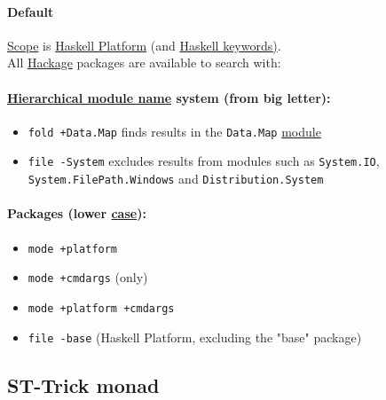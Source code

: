 \documentclass[11pt]{article}
\begin{document}
\paragraph{Default}
\label{sec:orga4efe3e}

\hyperref[orga4eed83]{Scope} is \href{http://hackage.haskell.org/platform}{Haskell Platform} (and \href{http://haskell.org/haskellwiki/Keywords}{Haskell keywords)}.\\

All \href{http://hackage.haskell.org/}{Hackage} packages are available to search with:\\

\paragraph{\hyperref[orgf2e653a]{Hierarchical module name} system (from big letter):}
\label{sec:org1b07e06}

\begin{itemize}
\item \texttt{fold +Data.Map} finds results in the \texttt{Data.Map} \hyperref[orgde475c6]{module}\\
\item \texttt{file -System} excludes results from modules such as \texttt{System.IO}, \texttt{System.FilePath.Windows} and \texttt{Distribution.System}\\
\end{itemize}

\paragraph{Packages (lower \hyperref[org96bceb0]{case}):}
\label{sec:org482fb31}
\begin{itemize}
\item \texttt{mode +platform}\\
\item \texttt{mode +cmdargs} (only)\\
\item \texttt{mode +platform +cmdargs}\\
\item \texttt{file -base} (Haskell Platform, excluding the "base" package)\\
\end{itemize}

\subsection{\label{org7c78127}ST-Trick monad}
\label{sec:org94367d9}
\end{document}
